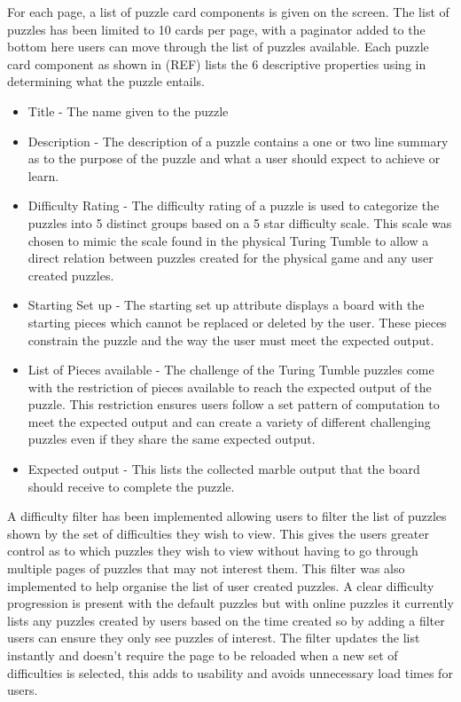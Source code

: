 \documentclass{l4proj}
\begin{document}
For each page, a list of puzzle card components is given on the screen. The list of puzzles has been limited to 10 cards per page, with a paginator added to the bottom  here users can move through the list of puzzles available. Each puzzle card component as shown in (REF) lists the 6 descriptive properties using in determining what the puzzle entails. 
\begin{itemize}
    \item Title - The name given to the puzzle
    \item Description - The description of a puzzle contains a one or two line summary as to the purpose of the puzzle and what a user should expect to achieve or learn.
    \item Difficulty Rating - The difficulty rating of a puzzle is used to categorize the puzzles into 5 distinct groups based on a 5 star difficulty scale. This scale was chosen to mimic the scale found in the physical Turing Tumble to allow a direct relation between puzzles created for the physical game and any user created puzzles.
    \item Starting Set up - The starting set up attribute displays a board with the starting pieces which cannot be replaced or deleted by the user. These pieces constrain the puzzle and the way the user must meet the expected output. 
    \item List of Pieces available - The challenge of the Turing Tumble puzzles come with the restriction of pieces available to reach the expected output of the puzzle. This restriction ensures users follow a set pattern of computation to meet the expected output and can create a variety of different challenging puzzles even if they share the same expected output.
    \item Expected output - This lists the collected marble output that the board should receive to complete the puzzle.
\end{itemize}
 
A difficulty filter has been implemented allowing users to filter the list of puzzles shown by the set of difficulties they wish to view. This gives the users greater control as to which puzzles they wish to view without having to  go through multiple pages of puzzles that may not interest them. This filter was also implemented to help organise the list of user created puzzles. A clear difficulty progression is present with the default puzzles but with online puzzles it currently lists any puzzles created by users based on the time created so by adding a filter users can ensure they only see puzzles of interest. The filter updates the list instantly and doesn't require the page to be reloaded when a new set of difficulties is selected, this adds to usability and avoids unnecessary load times for users.
\end{document}
